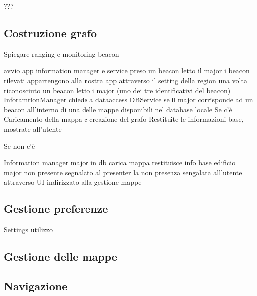 \documentclass[../ManualeSviluppatore.tex]{subfiles}
\begin{document}
			???
			
		\subsection{Costruzione grafo}
		
		
			
								
			
			Spiegare ranging e monitoring beacon
			
			avvio app
			information manager e service
			preso un beacon letto il major
			i beacon rilevati appartengono alla nostra app attraverso il setting della region
			una volta riconosciuto un beacon 
			letto i major (uno dei tre identificativi del beacon)
			InforamtionManager chiede a dataaccess DBService se il major corrisponde ad un beacon all'interno di una delle mappe disponibili nel database locale
			Se c'è
				Caricamento della mappa e creazione del grafo
				Restituite le informazioni base, mostrate all'utente
				
			Se non c'è
				
				
			Information manager 
				major in db
					carica mappa
					restituisce info base edificio
				major non presente
					segnalato al presenter la non presenza
					sengalata all'utente attraverso UI
					indirizzato alla gestione mappe
					
			
			

	\subsection{Gestione preferenze}

				
		Settings
		utilizzo
		
	
	\subsection{Gestione delle mappe}
			
		
	
	\subsection{Navigazione}
\end{document}
